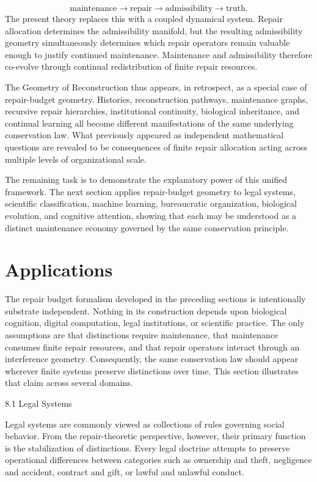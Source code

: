 \documentclass[12pt,oneside]{article}
\theoremstyle{plain}
\theoremstyle{definition}
\theoremstyle{remark}
\begin{document}
\[
\text{maintenance}
\rightarrow
\text{repair}
\rightarrow
\text{admissibility}
\rightarrow
\text{truth}.
\]
The present theory replaces this with a coupled dynamical system. Repair allocation determines the admissibility manifold, but the resulting admissibility geometry simultaneously determines which repair operators remain valuable enough to justify continued maintenance. Maintenance and admissibility therefore co-evolve through continual redistribution of finite repair resources.

The Geometry of Reconstruction thus appears, in retrospect, as a special case of repair-budget geometry. Histories, reconstruction pathways, maintenance graphs, recursive repair hierarchies, institutional continuity, biological inheritance, and continual learning all become different manifestations of the same underlying conservation law. What previously appeared as independent mathematical questions are revealed to be consequences of finite repair allocation acting across multiple levels of organizational scale.

The remaining task is to demonstrate the explanatory power of this unified framework. The next section applies repair-budget geometry to legal systems, scientific classification, machine learning, bureaucratic organization, biological evolution, and cognitive attention, showing that each may be understood as a distinct maintenance economy governed by the same conservation principle.

\section{Applications}

The repair budget formalism developed in the preceding sections is intentionally substrate independent. Nothing in its construction depends upon biological cognition, digital computation, legal institutions, or scientific practice. The only assumptions are that distinctions require maintenance, that maintenance consumes finite repair resources, and that repair operators interact through an interference geometry. Consequently, the same conservation law should appear wherever finite systems preserve distinctions over time. This section illustrates that claim across several domains.

8.1 Legal Systems

Legal systems are commonly viewed as collections of rules governing social behavior. From the repair-theoretic perspective, however, their primary function is the stabilization of distinctions. Every legal doctrine attempts to preserve operational differences between categories such as ownership and theft, negligence and accident, contract and gift, or lawful and unlawful conduct.
\end{document}
